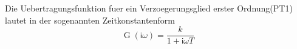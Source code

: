 Die Uebertragungsfunktion fuer ein Verzoegerungsglied erster Ordnung(PT1) lautet in der sogenannten Zeitkonstantenform
$$\operatorname{G}(\mathsf{i} \omega) = \frac{k}{1 + \mathsf{i} \omega T}$$

